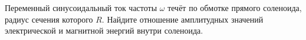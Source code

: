 \documentclass[__main__.tex]{subfiles}
\begin{document}
Переменный синусоидальный ток частоты $\omega$ течёт по обмотке прямого соленоида, радиус сечения которого $R$. Найдите отношение амплитудных значений электрической и магнитной энергий внутри соленоида.\\ 

\end{document}
